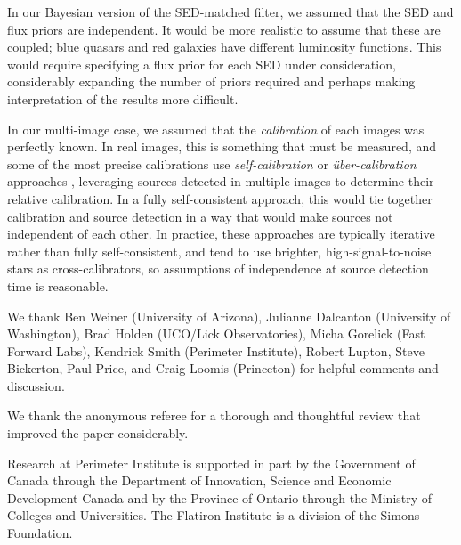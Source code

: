\documentclass[11pt,letterpaper,linenumbers]{aastex7}
\newcommand{\changed}[1]{#1}
\begin{document}
\changed{
In our Bayesian version of the SED-matched filter, we assumed that the
SED and flux priors are independent.  It would be more realistic to
assume that these are coupled; blue quasars and red galaxies have
different luminosity functions.  This would require specifying a flux
prior for each SED under consideration, considerably expanding the
number of priors required and perhaps making interpretation of the
results more difficult.
}


\changed{
In our multi-image case, we assumed that the \emph{calibration} of
each images was perfectly known.  In real images, this is something
that must be measured, and some of the most precise calibrations use
\emph{self-calibration} or \emph{\"uber-calibration} approaches
\citep{ubercal}, leveraging sources detected in multiple images to
determine their relative calibration.  In a fully self-consistent
approach, this would tie together calibration and source detection in
a way that would make sources not independent of each other.  In
practice, these approaches are typically iterative rather than fully
self-consistent, and tend to use brighter, high-signal-to-noise stars
as cross-calibrators, so assumptions of independence at source
detection time is reasonable.
}

\begin{acknowledgments}
We thank
Ben Weiner (University of Arizona),
Julianne Dalcanton (University of Washington),
Brad Holden (UCO/Lick Observatories),
Micha Gorelick (Fast Forward Labs),
Kendrick Smith (Perimeter Institute),
Robert Lupton, Steve Bickerton, Paul Price, and Craig Loomis (Princeton)
for helpful comments and discussion.

We thank the anonymous referee for a thorough and thoughtful review
that improved the paper considerably.

Research at Perimeter Institute is supported in part by the Government
of Canada through the Department of Innovation, Science and Economic
Development Canada and by the Province of Ontario through the Ministry
of Colleges and Universities.
The Flatiron Institute is a division of the Simons Foundation.
\end{acknowledgments}
\end{document}
